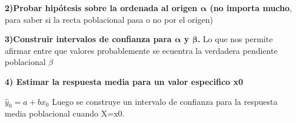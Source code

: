 \documentclass[10pt,a4paper]{article}
\begin{document}
\textbf{2)Probar hipótesis sobre la ordenada al origen $\boldsymbol{\alpha}$ (no importa mucho}, para saber si la recta poblacional pasa o no por el origen)

\textbf{3)Construir intervalos de confianza para $\boldsymbol{\alpha}$ y $\boldsymbol{\beta}$.} Lo que nos permite afirmar entre que valores probablemente se ecuentra la verdadera pendiente poblacional $\beta$

\textbf{4) Estimar la respuesta media para un valor especifico x0}

\hspace{1cm}$\hat{y}_0 = a + bx_0$ \quad Luego se construye un intervalo de confianza para la respuesta media poblacional cuando X=x0.
\end{document}

